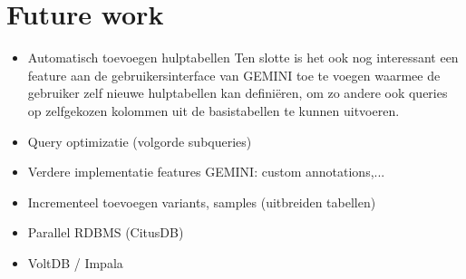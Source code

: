 \chapter{Future work}

\begin{itemize}
\item Automatisch toevoegen hulptabellen Ten slotte is het ook nog interessant een feature aan de gebruikersinterface van GEMINI toe te voegen waarmee de gebruiker zelf nieuwe hulptabellen kan defini\"eren, om zo andere ook queries op zelfgekozen kolommen uit de basistabellen te kunnen uitvoeren.
\item Query optimizatie (volgorde subqueries)
\item Verdere implementatie features GEMINI: custom annotations,...
\item Incrementeel toevoegen variants, samples (uitbreiden tabellen)
\item Parallel RDBMS (CitusDB)
\item VoltDB / Impala
\end{itemize}